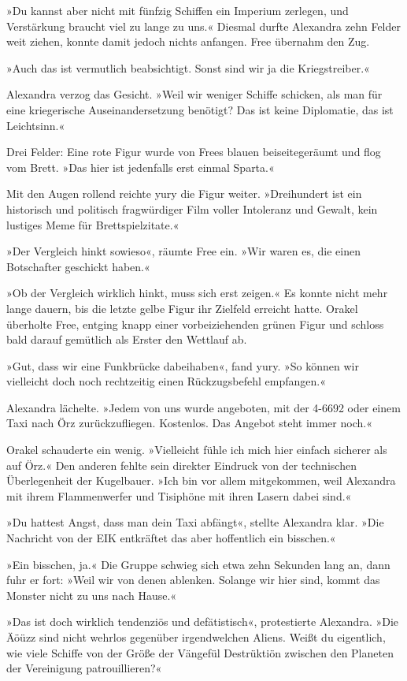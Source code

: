 »Du kannst aber nicht mit fünfzig Schiffen ein Imperium zerlegen, und Verstärkung braucht viel zu lange zu uns.« Diesmal durfte Alexandra zehn Felder weit ziehen, konnte damit jedoch nichts anfangen. Free übernahm den Zug.

»Auch das ist vermutlich beabsichtigt. Sonst sind wir ja die Kriegstreiber.«

Alexandra verzog das Gesicht. »Weil wir weniger Schiffe schicken, als man für eine kriegerische Auseinandersetzung benötigt? Das ist keine Diplomatie, das ist Leichtsinn.«

Drei Felder: Eine rote Figur wurde von Frees blauen beiseitegeräumt und flog vom Brett. »Das hier ist jedenfalls erst einmal Sparta.«

Mit den Augen rollend reichte yury die Figur weiter. »Dreihundert ist ein historisch und politisch fragwürdiger Film voller Intoleranz und Gewalt, kein lustiges Meme für Brettspielzitate.«

»Der Vergleich hinkt sowieso«, räumte Free ein. »Wir waren es, die einen Botschafter geschickt haben.«

»Ob der Vergleich wirklich hinkt, muss sich erst zeigen.« Es konnte nicht mehr lange dauern, bis die letzte gelbe Figur ihr Zielfeld erreicht hatte. Orakel überholte Free, entging knapp einer vorbeiziehenden grünen Figur und schloss bald darauf gemütlich als Erster den Wettlauf ab.

»Gut, dass wir eine Funkbrücke dabeihaben«, fand yury. »So können wir vielleicht doch noch rechtzeitig einen Rückzugsbefehl empfangen.«

Alexandra lächelte. »Jedem von uns wurde angeboten, mit der 4-6692 oder einem Taxi nach Örz zurückzufliegen. Kostenlos. Das Angebot steht immer noch.«

Orakel schauderte ein wenig. »Vielleicht fühle ich mich hier einfach sicherer als auf Örz.« Den anderen fehlte sein direkter Eindruck von der technischen Überlegenheit der Kugelbauer. »Ich bin vor allem mitgekommen, weil Alexandra mit ihrem Flammenwerfer und Tisiphöne mit ihren Lasern dabei sind.«

»Du hattest Angst, dass man dein Taxi abfängt«, stellte Alexandra klar. »Die Nachricht von der EIK entkräftet das aber hoffentlich ein bisschen.«

»Ein bisschen, ja.« Die Gruppe schwieg sich etwa zehn Sekunden lang an, dann fuhr er fort: »Weil wir von denen ablenken. Solange wir hier sind, kommt das Monster nicht zu uns nach Hause.«

»Das ist doch wirklich tendenziös und defätistisch«, protestierte Alexandra. »Die Äöüzz sind nicht wehrlos gegenüber irgendwelchen Aliens. Weißt du eigentlich, wie viele Schiffe von der Größe der Vängefül Destrüktiön zwischen den Planeten der Vereinigung patrouillieren?«

